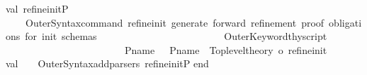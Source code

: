 \begin{isabellebody}
\isanewline
val\ refine{\isacharunderscore}initP\ {\isacharequal}\isanewline
\ \ \ \ OuterSyntax{\isachardot}command\ {\isachardoublequote}refine{\isacharunderscore}init{\isachardoublequote}\ {\isachardoublequote}generate\ forward\ refinement\ proof\ obligations\ for\ init\ schemas{\isachardoublequote}\ \isanewline
\ \ \ \ \ \ \ \ \ \ \ \ \ \ \ \ \ \ \ \ \ \ \ \ OuterKeyword{\isachardot}thy{\isacharunderscore}script\isanewline
\ \ \ \ \ \ \ \ \ \ \ \ \ \ \ \ \ \ \ \ \ \ \ \ {\isacharparenleft}{\isacharparenleft}P{\isachardot}name{\isacharparenright}\ \ {\isacharminus}{\isacharminus}\ {\isacharparenleft}P{\isachardot}name{\isacharparenright}\ {\isachargreater}{\isachargreater}\ {\isacharparenleft}Toplevel{\isachardot}theory\ o\ refine{\isacharunderscore}init{\isacharparenright}{\isacharparenright}{\isacharsemicolon}\isanewline
val\ {\isacharunderscore}\ {\isacharequal}\ \ OuterSyntax{\isachardot}add{\isacharunderscore}parsers\ {\isacharbrackleft}refine{\isacharunderscore}initP{\isacharbrackright}{\isacharsemicolon}\isanewline
\isanewline
\isanewline
\isanewline
\isanewline
end\isanewline
\isanewline
{\isacharverbatimclose}%
\endisatagML
{\isafoldML}%
%
\isadelimML
%
\endisadelimML
\isanewline
%
\isadelimtheory
\isanewline
%
\endisadelimtheory
%
\isatagtheory
{}\isamarkupfalse%
%
\endisatagtheory
{\isafoldtheory}%
%
\isadelimtheory
%
\endisadelimtheory
\isanewline
\end{isabellebody}%
